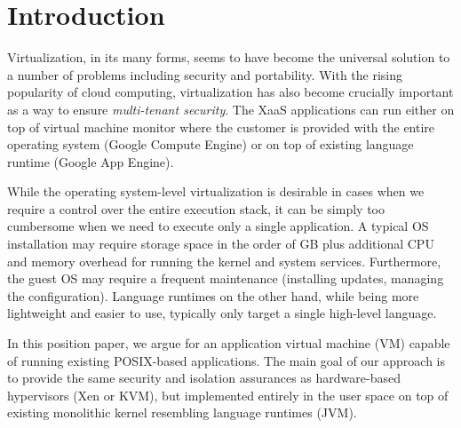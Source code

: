 \section{Introduction}
\label{sec:intro}



Virtualization, in its many forms, seems to have become the universal
solution to a number of problems including security and portability.
With the rising popularity of cloud computing, virtualization has also
become crucially important as a way to ensure \emph{multi-tenant
security}. The XaaS applications can run either on top of virtual
machine monitor where the customer is provided with the entire operating
system (\eg Google Compute Engine) or on top of existing language
runtime (\eg Google App Engine).

While the operating system-level virtualization is desirable in cases
when we require a control over the entire execution stack, it can be
simply too cumbersome when we need to execute only a single application.
A typical OS installation may require storage space in the order of GB
plus additional CPU and memory overhead for running the kernel and
system services. Furthermore, the guest OS may require a frequent
maintenance (\eg installing updates, managing the configuration).
Language runtimes on the other hand, while being more lightweight and
easier to use, typically only target a single high-level language. 

In this position paper, we argue for an application virtual machine (VM)
capable of running existing POSIX-based applications. The main goal of
our approach is to provide the same security and isolation assurances as
hardware-based hypervisors (\eg Xen or KVM), but implemented entirely in
the user space on top of existing monolithic kernel resembling language
runtimes (\eg JVM).



